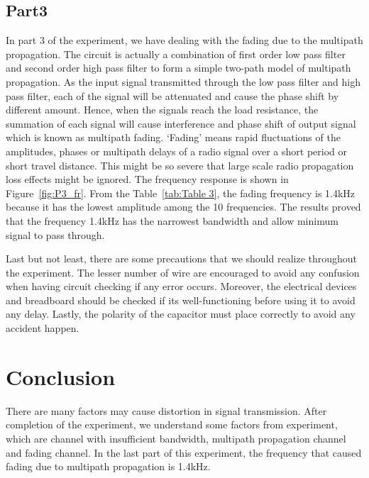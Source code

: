 \documentclass[a4paper, 12pt, english]{article}
\begin{document}
\subsection{Part3}
In part 3 of the experiment, we have dealing with the fading due to the
multipath propagation. The circuit is actually a combination of first order low
pass filter and second order high pass filter to form a simple two-path model
of multipath propagation. As the input signal transmitted through the low pass
filter and high pass filter, each of the signal will be attenuated and cause
the phase shift by different amount. Hence, when the signals reach the load
resistance, the summation of each signal will cause interference and phase
shift of output signal which is known as multipath fading. ‘Fading’ means rapid
fluctuations of the amplitudes, phases or multipath delays of a radio signal
over a short period or short travel distance. This might be so severe that
large scale radio propagation loss effects might be ignored. The frequency
response is shown in Figure~\ref{fig:P3_fr}. From the Table~\ref{tab:Table 3},
the fading frequency is 1.4kHz because it has the lowest amplitude among the 10
frequencies. The results proved that the frequency 1.4kHz has the narrowest
bandwidth and allow minimum signal to pass through. \newline

Last but not least, there are some precautions that we should realize
throughout the experiment. The lesser number of wire are encouraged to avoid
any confusion when having circuit checking if any error occurs. Moreover, the
electrical devices and breadboard should be checked if its well-functioning
before using it to avoid any delay. Lastly, the polarity of the capacitor must
place correctly to avoid any accident happen.

\newpage
\section{Conclusion}
There are many factors may cause distortion in signal transmission. After
completion of the experiment, we understand some factors from experiment, which
are channel with insufficient bandwidth, multipath propagation channel and
fading channel. In the last part of this experiment, the frequency that caused
fading due to multipath propagation is 1.4kHz.

\end{document}
